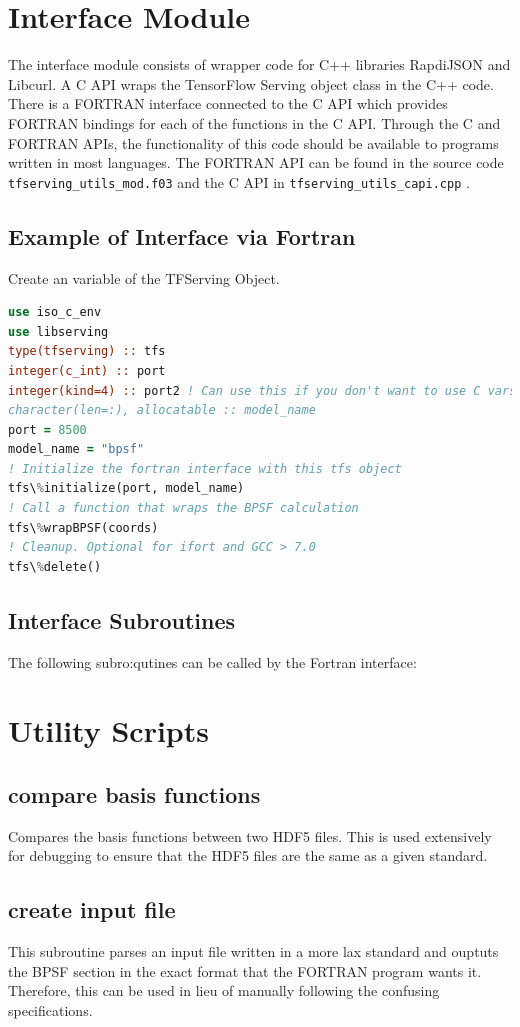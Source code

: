 \documentclass{article}
\begin{document}
\section{Interface Module}
The interface module consists of wrapper code for C++ libraries RapdiJSON and Libcurl.
A C API wraps the TensorFlow Serving object class in the C++ code. 
There is a FORTRAN interface connected to the C API which provides FORTRAN bindings for each of the functions in the C API.
Through the C and FORTRAN APIs, the functionality of this code should be available to programs written in most languages.
The FORTRAN API can be found in the source code \texttt{tfserving\_utils\_mod.f03} and the C API in \texttt{tfserving\_utils\_capi.cpp} .

\subsection{Example of Interface via Fortran}
Create an variable of the TFServing Object.

\begin{lstlisting}[language=Fortran]
use iso_c_env
use libserving
type(tfserving) :: tfs
integer(c_int) :: port
integer(kind=4) :: port2 ! Can use this if you don't want to use C vars
character(len=:), allocatable :: model_name
port = 8500
model_name = "bpsf"
! Initialize the fortran interface with this tfs object
tfs\%initialize(port, model_name)
! Call a function that wraps the BPSF calculation
tfs\%wrapBPSF(coords)
! Cleanup. Optional for ifort and GCC > 7.0
tfs\%delete()
\end{lstlisting}

\subsection{Interface Subroutines}
The following subro:qutines can be called by the Fortran interface:

\section{Utility Scripts}
\subsection{compare basis functions}
Compares the basis functions between two HDF5 files.
This is used extensively for debugging to ensure that the HDF5 files are the same as a given standard.

\subsection{create input file}
This subroutine parses an input file written in a more lax standard and ouptuts the BPSF section in the exact format that the FORTRAN program wants it.
Therefore, this can be used in lieu of manually following the confusing specifications.
\end{document}
